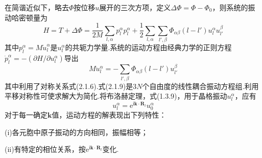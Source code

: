 在简谐近似下，略去$\Phi$按位移$u$展开的三次方项，定义$\Delta\Phi=\Phi-\Phi_0$，则系统的振动哈密顿量为
\begin{equation}
  H=T+\Delta\Phi=\frac{1}{2M}\sum_{l,\alpha}p_l^{\alpha}p_l^{\alpha}
  +\frac{1}{2}\sum_{l,\alpha}\sum_{l',\beta}\Phi_{\alpha\beta}(l-l')u_l^{\alpha}u_{l'}^{\beta}
\end{equation}
其中$p_l^{\alpha}=M\dot{u}_l^{\alpha}$是$u_l^{\alpha}$的共轭力学量.系统的运动方程由经典力学的正则方程$\dot{p}_l^{\alpha}=-(\partial H/\partial u_l^{\alpha})$导出
\begin{equation}
  M\ddot{u}_l^{\alpha}=-\sum_{l',\beta}\Phi_{\alpha\beta}(l-l')u_{l'}^{\beta}
\end{equation}
其中利用了对称关系式(2.1.6).式(2.1.9)是$3N$个自由度的线性耦合振动方程组.利用平移对称性可使求解大为简化.将布洛赫定理，式(1.3.9)，用于晶格振动$u_l^{\alpha}$，应有
\begin{equation}
  u_l^{\alpha}=\mathrm{e}^{\mathrm{i}\boldsymbol{k}\cdot\boldsymbol{R}_l}u_0^{\alpha}
\end{equation}
对于每一确定$\boldsymbol{k}$值，运动方程的解表现出下列特性：

(i)各元胞中原子振动的方向相同，振幅相等；

(ii)有特定的相位关系，按$\mathrm{e}^{\mathrm{i}\boldsymbol{k}\cdot\boldsymbol{R}_l}$变化.

